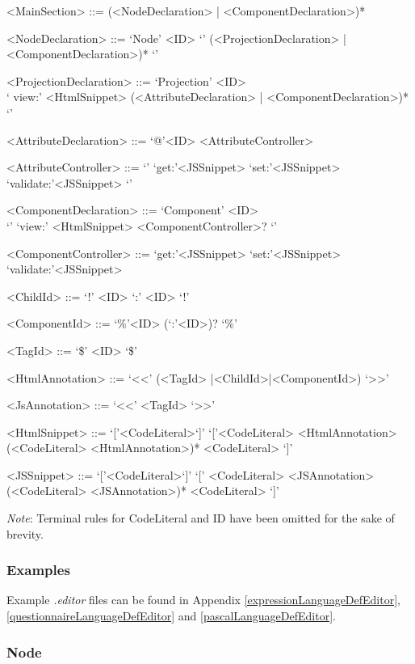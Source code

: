 \documentclass{article}
\begin{document}
{\begin{grammar}
<MainSection> ::= (<NodeDeclaration> | <ComponentDeclaration>)*

<NodeDeclaration> ::= `Node' <ID> `{' (<ProjectionDeclaration> | <ComponentDeclaration>)* `}'

<ProjectionDeclaration> ::= `Projection' <ID> \\ `{ view:' <HtmlSnippet> (<AttributeDeclaration> | <ComponentDeclaration>)* `}'

<AttributeDeclaration> ::= `@'<ID> <AttributeController>

<AttributeController> ::= `{' `get:'<JSSnippet> `set:'<JSSnippet> `validate:'<JSSnippet> `}'

<ComponentDeclaration> ::= `Component' <ID> \\`{' `view:' <HtmlSnippet> <ComponentController>? `}'

<ComponentController> ::= `get:'<JSSnippet> `set:'<JSSnippet> `validate:'<JSSnippet> 
 
<ChildId> ::= `!' <ID> `:' <ID> `!'
 
<ComponentId> ::= `\%'<ID> (`:'<ID>)? `\%'

<TagId> ::= `\$' <ID> `\$' 

<HtmlAnnotation> ::= `<<' (<TagId> |<ChildId>|<ComponentId>) `>>'

<JsAnnotation> ::= `<<' <TagId> `>>'

<HtmlSnippet> ::= `['<CodeLiteral>`]'
\alt `['<CodeLiteral> <HtmlAnnotation> (<CodeLiteral> <HtmlAnnotation>)*  <CodeLiteral> `]'

<JSSnippet> ::= `['<CodeLiteral>`]'
\alt `[' <CodeLiteral> <JSAnnotation> (<CodeLiteral> <JSAnnotation>)*  <CodeLiteral> `]'


\end{grammar}

\emph{Note}: Terminal rules for CodeLiteral and ID have been omitted for the sake of brevity.

\subsubsection{Examples}
Example \emph{.editor} files can be found in Appendix \ref{expressionLanguageDefEditor}, \ref{questionnaireLanguageDefEditor} and \ref{pascalLanguageDefEditor}.


\subsubsection{Node}

}
\end{document}
